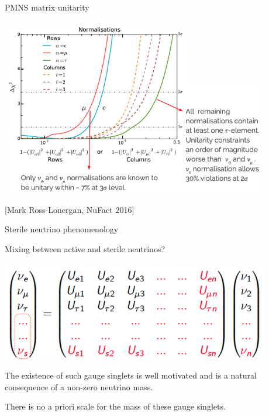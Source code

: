 \begin{frame}{PMNS matrix unitarity}

    \begin{center}
      \includegraphics[width=0.88\textwidth]{./images/osc101/unitarity_limits}\\
    \end{center}
    \vspace{0.2cm}
    {\scriptsize \color{blue}[Mark Ross-Lonergan, NuFact 2016]}
\end{frame}
%
%
%

\begin{frame}[t]{Sterile neutrino phenomenology}

Mixing between active and sterile neutrinos?

\begin{center}
  \includegraphics[width=0.88\textwidth]{./images/osc101/bigger_pmns}\\
\end{center}

The existence of such gauge singlets is well motivated and is a
natural consequence of a non-zero neutrino mass.\\

\vspace{0.2cm}

There is no a priori scale for the mass of these gauge singlets.

\end{frame}

